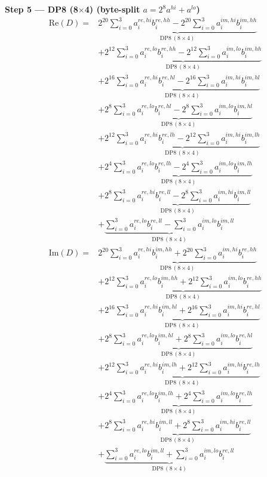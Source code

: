 \documentclass[fleqn]{article}
\newcommand{\DPop}[3]{\mathrm{DP#1}\,(#2\!\times\!#3)}
\begin{document}
\noindent\textbf{Step 5 --- DP8 (8$\times$4) \quad (byte-split $a = 2^{8} a^{hi} + a^{lo}$)}
\begin{align*}
\mathrm{Re}(D) = {}
  & \underbrace{2^{20}\sum_{i=0}^{3} a_i^{re,hi} b_i^{re,hh} - 2^{20}\sum_{i=0}^{3} a_i^{im,hi} b_i^{im,hh}}_{\DPop{8}{8}{4}} \\[0.7em]
  & + \underbrace{2^{12}\sum_{i=0}^{3} a_i^{re,lo} b_i^{re,hh} - 2^{12}\sum_{i=0}^{3} a_i^{im,lo} b_i^{im,hh}}_{\DPop{8}{8}{4}} \\[0.7em]
  & + \underbrace{2^{16}\sum_{i=0}^{3} a_i^{re,hi} b_i^{re,hl} - 2^{16}\sum_{i=0}^{3} a_i^{im,hi} b_i^{im,hl}}_{\DPop{8}{8}{4}} \\[0.7em]
  & + \underbrace{2^{8}\sum_{i=0}^{3} a_i^{re,lo} b_i^{re,hl} - 2^{8}\sum_{i=0}^{3} a_i^{im,lo} b_i^{im,hl}}_{\DPop{8}{8}{4}} \\[0.7em]
  & + \underbrace{2^{12}\sum_{i=0}^{3} a_i^{re,hi} b_i^{re,lh} - 2^{12}\sum_{i=0}^{3} a_i^{im,hi} b_i^{im,lh}}_{\DPop{8}{8}{4}} \\[0.7em]
  & + \underbrace{2^{4}\sum_{i=0}^{3} a_i^{re,lo} b_i^{re,lh} - 2^{4}\sum_{i=0}^{3} a_i^{im,lo} b_i^{im,lh}}_{\DPop{8}{8}{4}} \\[0.7em]
  & + \underbrace{2^{8}\sum_{i=0}^{3} a_i^{re,hi} b_i^{re,ll} - 2^{8}\sum_{i=0}^{3} a_i^{im,hi} b_i^{im,ll}}_{\DPop{8}{8}{4}} \\[0.7em]
  & + \underbrace{\sum_{i=0}^{3} a_i^{re,lo} b_i^{re,ll} - \sum_{i=0}^{3} a_i^{im,lo} b_i^{im,ll}}_{\DPop{8}{8}{4}}
\end{align*}
\begin{align*}
\mathrm{Im}(D) = {}
  & \underbrace{2^{20}\sum_{i=0}^{3} a_i^{re,hi} b_i^{im,hh} + 2^{20}\sum_{i=0}^{3} a_i^{im,hi} b_i^{re,hh}}_{\DPop{8}{8}{4}} \\[0.7em]
  & + \underbrace{2^{12}\sum_{i=0}^{3} a_i^{re,lo} b_i^{im,hh} + 2^{12}\sum_{i=0}^{3} a_i^{im,lo} b_i^{re,hh}}_{\DPop{8}{8}{4}} \\[0.7em]
  & + \underbrace{2^{16}\sum_{i=0}^{3} a_i^{re,hi} b_i^{im,hl} + 2^{16}\sum_{i=0}^{3} a_i^{im,hi} b_i^{re,hl}}_{\DPop{8}{8}{4}} \\[0.7em]
  & + \underbrace{2^{8}\sum_{i=0}^{3} a_i^{re,lo} b_i^{im,hl} + 2^{8}\sum_{i=0}^{3} a_i^{im,lo} b_i^{re,hl}}_{\DPop{8}{8}{4}} \\[0.7em]
  & + \underbrace{2^{12}\sum_{i=0}^{3} a_i^{re,hi} b_i^{im,lh} + 2^{12}\sum_{i=0}^{3} a_i^{im,hi} b_i^{re,lh}}_{\DPop{8}{8}{4}} \\[0.7em]
  & + \underbrace{2^{4}\sum_{i=0}^{3} a_i^{re,lo} b_i^{im,lh} + 2^{4}\sum_{i=0}^{3} a_i^{im,lo} b_i^{re,lh}}_{\DPop{8}{8}{4}} \\[0.7em]
  & + \underbrace{2^{8}\sum_{i=0}^{3} a_i^{re,hi} b_i^{im,ll} + 2^{8}\sum_{i=0}^{3} a_i^{im,hi} b_i^{re,ll}}_{\DPop{8}{8}{4}} \\[0.7em]
  & + \underbrace{\sum_{i=0}^{3} a_i^{re,lo} b_i^{im,ll} + \sum_{i=0}^{3} a_i^{im,lo} b_i^{re,ll}}_{\DPop{8}{8}{4}}
\end{align*}
\end{document}
